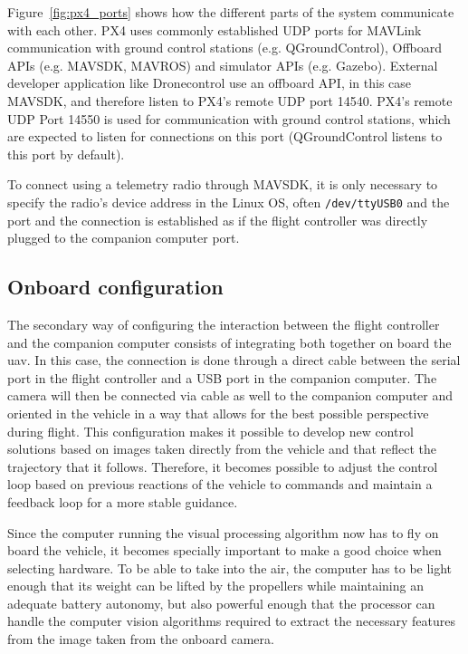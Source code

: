 Figure~\ref{fig:px4_ports} shows how the different parts of the system communicate with each other.
PX4 uses commonly established UDP ports for MAVLink communication with ground control stations (e.g. QGroundControl), Offboard APIs (e.g. MAVSDK, MAVROS) and simulator APIs (e.g. Gazebo).
External developer application like Dronecontrol use an offboard API, in this case MAVSDK, and therefore listen to PX4's remote UDP port 14540.
PX4's remote UDP Port 14550 is used for communication with ground control stations, which are expected to listen for connections on this port (QGroundControl listens to this port by default).

To connect using a telemetry radio through MAVSDK, it is only necessary to specify the radio's device address in the Linux OS, often \verb|/dev/ttyUSB0| and the port and the connection is established as if the flight controller was directly plugged to the companion computer port.

\subsection{Onboard configuration}

The secondary way of configuring the interaction between the flight controller and the companion computer consists of integrating both together on board the \gls{uav}.
In this case, the connection is done through a direct cable between the serial port in the flight controller and a USB port in the companion computer.
The camera will then be connected via cable as well to the companion computer and oriented in the vehicle in a way that allows for the best possible perspective during flight.
This configuration makes it possible to develop new control solutions based on images taken directly from the vehicle and that reflect the trajectory that it follows.
Therefore, it becomes possible to adjust the control loop based on previous reactions of the vehicle to commands and maintain a feedback loop for a more stable guidance.

Since the computer running the visual processing algorithm now has to fly on board the vehicle, it becomes specially important to make a good choice when selecting hardware.
To be able to take into the air, the computer has to be light enough that its weight can be lifted by the propellers while maintaining an adequate battery autonomy, but also powerful enough that the processor can handle the computer vision algorithms required to extract the necessary features from the image taken from the onboard camera.

